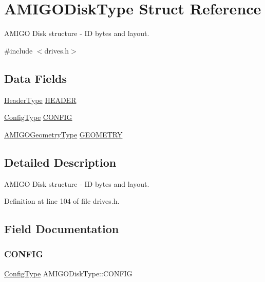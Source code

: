 \hypertarget{structAMIGODiskType}{}\section{A\+M\+I\+G\+O\+Disk\+Type Struct Reference}
\label{structAMIGODiskType}


A\+M\+I\+GO Disk structure -\/ ID bytes and layout.  




{\ttfamily \#include $<$drives.\+h$>$}

\subsection*{Data Fields}
\begin{DoxyCompactItemize}
\item 
\hyperlink{structHeaderType}{Header\+Type} \hyperlink{structAMIGODiskType_a9814efe6f564b104fc7e0100231908a8}{H\+E\+A\+D\+ER}
\item 
\hyperlink{structConfigType}{Config\+Type} \hyperlink{structAMIGODiskType_aae94c3403ceb917006591e7bd4109207}{C\+O\+N\+F\+IG}
\item 
\hyperlink{structAMIGOGeometryType}{A\+M\+I\+G\+O\+Geometry\+Type} \hyperlink{structAMIGODiskType_ade07402a60cc0e5824ca61f6a4ea88d9}{G\+E\+O\+M\+E\+T\+RY}
\end{DoxyCompactItemize}


\subsection{Detailed Description}
A\+M\+I\+GO Disk structure -\/ ID bytes and layout. 

Definition at line 104 of file drives.\+h.



\subsection{Field Documentation}
\mbox{\label{structAMIGODiskType_aae94c3403ceb917006591e7bd4109207}} 
\subsubsection{\texorpdfstring{C\+O\+N\+F\+IG}{CONFIG}}
{\footnotesize\ttfamily \hyperlink{structConfigType}{Config\+Type} A\+M\+I\+G\+O\+Disk\+Type\+::\+C\+O\+N\+F\+IG}



